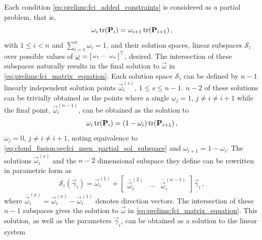 Each condition \eqref{eq:prelims:fci_added_constraints} is considered as a partial problem, that is,
\begin{equation}\label{eq:cloud_fusion:secfci_nsen_partial_sol_subspace}
    \omega_i\tr(\mat{P}_i) = \omega_{i+1}\tr(\mat{P}_{i+1})\,,
\end{equation}
with $1\leq i< n$ and $\sum_{i=1}^n\omega_i=1$, and their solution spaces, linear subspaces $\mathcal{S}_i$ over possible values of $\vec{\omega}=\begin{bsmallmatrix}\omega_1 & \cdots & \omega_n\end{bsmallmatrix}^\top$, desired. The intersection of these subspaces naturally results in the final solution to $\vec{\omega}$ in \eqref{eq:prelims:fci_matrix_equation}. Each solution space $\mathcal{S}_i$ can be defined by $n-1$ linearly independent solution points $\vec{\omega}_i^{(s)}$, $1\leq s\leq n-1$. $n-2$ of these solutions can be trivially obtained as the points where a single $\omega_j=1$, $j\neq i\neq i+1$ while the final point, $\vec{\omega}_i^{(n-1)}$, can be obtained as the solution to
\begin{equation}\label{eq:cloud_fusion:secfci_nsen_partial_sol_point}
    \omega_i\tr(\mat{P}_i) = (1-\omega_i)\tr(\mat{P}_{i+1})\,,
\end{equation}
$\omega_j=0$, $j\neq i\neq i+1$, noting equivalence to \eqref{eq:cloud_fusion:secfci_nsen_partial_sol_subspace} and $\omega_{i+1}=1-\omega_i$. The solutions $\vec{\omega}_i^{(s)}$ and the $n-2$ dimensional subspace they define can be rewritten in parametric form as
\begin{equation}\label{eq:cloud_fusion:secfci_nsen_partial_subspace}
    \mathcal{S}_i(\vec{\gamma}_i)=\vec{\omega}_i^{(1)} + 
    \begin{bmatrix}
        \bar{\vec{\omega}}_i^{(2)} & \cdots & \bar{\vec{\omega}}_i^{(n-1)}
    \end{bmatrix}
    \vec{\gamma}_i\,,
\end{equation}
where $\bar{\vec{\omega}}_i^{(x)}=\vec{\omega}_i^{(x)}-\vec{\omega}_i^{(1)}$ denotes direction vectors. The intersection of these $n-1$ subspaces gives the solution to $\vec{\omega}$ in \eqref{eq:prelims:fci_matrix_equation}. This solution, as well as the parameters $\vec{\gamma}_i$, can be obtained as a solution to the linear system
